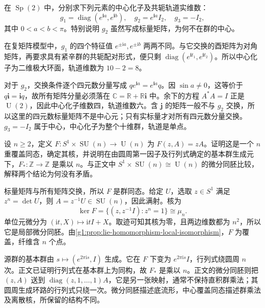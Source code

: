 \begin{exercise}\label{g1:ex:sp2-centralizers}
	在 \(\operatorname{Sp}(2)\) 中，分别求下列元素的中心化子及共轭轨道实维数：
	\[
		g_1=\operatorname{diag}(e^{\mathbf i a},e^{\mathbf i b}),\quad
		g_2=e^{\mathbf i a}I_2,\quad g_3=-I_2,
	\]
	其中 \(0<a<b<\pi\)。特别说明 \(g_2\) 虽然写成标量矩阵，为何不在群的中心。
\end{exercise}
\begin{solution}
	在复矩阵模型中，\(g_1\) 的四个特征值 \(e^{\pm\mathrm{i}a},e^{\pm\mathrm{i}b}\) 两两不同。与它交换的酉矩阵为对角矩阵，再要求具有紧辛群的共轭配对形式，便只剩 \(\operatorname{diag}(e^{\mathbf i t_1},e^{\mathbf i t_2})\)。所以中心化子为二维极大环面，轨道维数为 \(10-2=8\)。

	对于 \(g_2\)，交换条件逐个四元数分量写成 \(q e^{\mathbf i a}=e^{\mathbf i a}q\)。因 \(\sin a\ne0\)，这等价于 \(q\mathbf i=\mathbf i q\)，故所有矩阵分量必须落在 \(\mathbb C=\mathbb R+\mathbb R\mathbf i\) 中。余下的方程 \(A^*A=I\) 正是 \(\operatorname{U}(2)\)，因此中心化子维数四，轨道维数六。含 \(\mathbf j\) 的矩阵一般不与 \(g_2\) 交换，所以这里的四元数标量矩阵不是中心元；只有实标量才对所有四元数分量交换。\(g_3=-I_2\) 属于中心，中心化子为整个十维群，轨道是单点。
\end{solution}

\begin{exercise}\label{g1:ex:unitary-central-cover}
	设 \(n\ge2\)，定义 \(F:S^1\times\operatorname{SU}(n)\to\operatorname{U}(n)\) 为 \(F(z,A)=zA\)。证明这是一个 \(n\) 重覆盖同态，确定其核，并说明在由圆周第一因子及行列式确定的基本群生成元下，\(F_*:\mathbb Z\to\mathbb Z\) 是乘以 \(n\)。与正文中 \(S^1\times\operatorname{SU}(n)\cong\operatorname{U}(n)\) 的微分同胚比较，解释两个结论为何没有矛盾。
\end{exercise}
\begin{solution}
	标量矩阵与所有矩阵交换，所以 \(F\) 是群同态。给定 \(U\)，选取 \(z\in S^1\) 满足 \(z^n=\det U\)，则 \(A=z^{-1}U\in\operatorname{SU}(n)\)，因此满射。核为
	\[
		\ker F=\{(z,z^{-1}I):z^n=1\}\cong\mu_n.
	\]
	单位元微分为 \((\mathrm{i}t,X)\mapsto\mathrm{i}tI+X\)。取迹可知其核为零，且两边维数都为 \(n^2\)，所以它是局部微分同胚。由\cref{g1:prop:lie-homomorphism-local-isomorphism}，\(F\) 为覆盖，纤维含 \(n\) 个点。

	源群的基本群由 \(s\mapsto(e^{2\pi\mathrm{i}s},I)\) 生成。它在 \(F\) 下变为 \(e^{2\pi\mathrm{i}s}I\)，行列式绕圆周 \(n\) 次。正文已证明行列式在基本群上为同构，故 \(F_*\) 是乘以 \(n\)。正文的微分同胚则把 \((z,A)\) 送到 \(\operatorname{diag}(z,1,\ldots,1)A\)，它是另一张映射，通常不保持直积群乘法；其圆周生成环路的行列式只绕一次。微分同胚描述底流形，中心覆盖同态描述群乘法及离散核，所保留的结构不同。
\end{solution}
